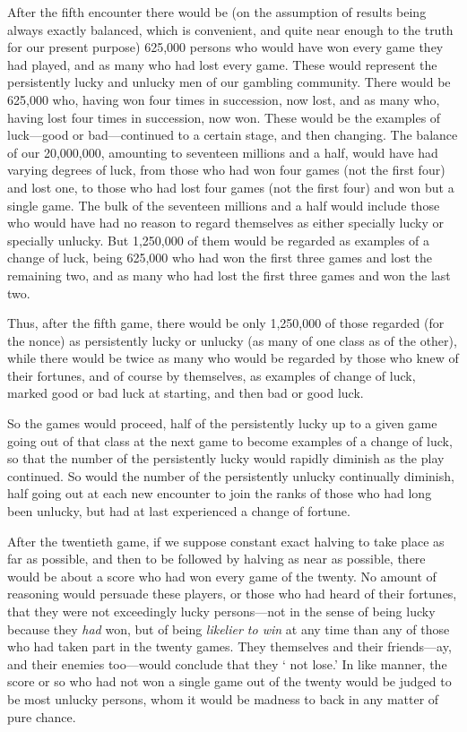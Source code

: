 \documentclass[letterpaper,12pt,oneside,openany]{memoir}
\begin{document}
After the fifth encounter there would be (on the assumption
of results being always exactly balanced, which
is convenient, and quite near enough to the truth for our
present purpose) 625,000 persons who would have won
every game they had played, and as many who had lost
every game. These would represent the persistently
lucky and unlucky men of our gambling community.
There would be 625,000 who, having won four times in
succession, now lost, and as many who, having lost four
times in succession, now won. These would be the
examples of luck---good or bad---continued to a certain
stage, and then changing. The balance of our 20,000,000,
amounting to seventeen millions and a half, would have
had varying degrees of luck, from those who had won
four games (not the first four) and lost one, to those
who had lost four games (not the first four) and won
but a single game. The bulk of the seventeen millions
and a half would include those who would have had no
reason to regard themselves as either specially lucky or
specially unlucky. But 1,250,000 of them would be
regarded as examples of a change of luck, being 625,000
who had won the first three games and lost the remaining
two, and as many who had lost the first three games
and won the last two.

Thus, after the fifth game, there would be only
1,250,000 of those regarded (for the nonce) as persistently
lucky or unlucky (as many of one class as of the
other), while there would be twice as many who would
be regarded by those who knew of their fortunes, and
of course by themselves, as examples of change of luck,
marked good or bad luck at starting, and then bad or
good luck.

So the games would proceed, half of the persistently
lucky up to a given game going out of that class at the
next game to become examples of a change of luck, so
that the number of the persistently lucky would rapidly
diminish as the play continued. So would the number
of the persistently unlucky continually diminish, half
going out at each new encounter to join the ranks of
those who had long been unlucky, but had at last experienced
a change of fortune.

After the twentieth game, if we suppose constant
exact halving to take place as far as possible, and then
to be followed by halving as near as possible, there
would be about a score who had won every game of the
twenty. No amount of reasoning would persuade these
players, or those who had heard of their fortunes, that
they were not exceedingly lucky persons---not in the
sense of being lucky because they \textit{had} won, but of
being \textit{likelier to win} at any time than any of those who
had taken part in the twenty games. They themselves
and their friends---ay, and their enemies too---would
conclude that they ` not lose.' In like manner,
the score or so who had not won a single game out of
the twenty would be judged to be most unlucky persons,
whom it would be madness to back in any matter of
pure chance.
\end{document}
